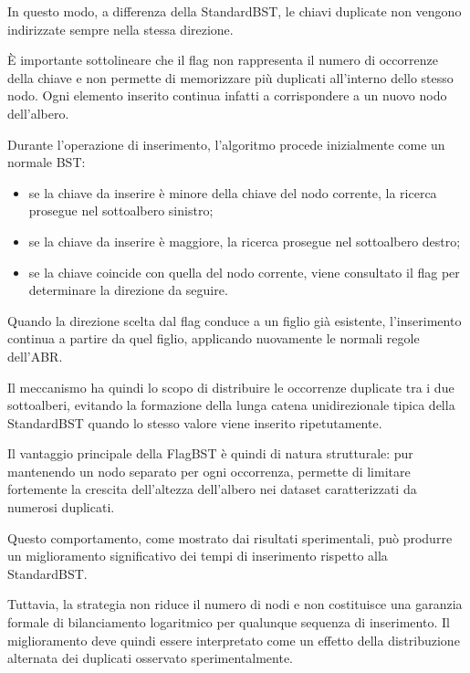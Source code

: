 \documentclass[a4paper,12pt]{article}
\begin{document}
In questo modo, a differenza della StandardBST, le chiavi duplicate non vengono indirizzate sempre nella stessa direzione.

È importante sottolineare che il flag non rappresenta il numero di occorrenze della chiave e non permette di memorizzare più duplicati all'interno dello stesso nodo. Ogni elemento inserito continua infatti a corrispondere a un nuovo nodo dell'albero.

Durante l'operazione di inserimento, l'algoritmo procede inizialmente come un normale BST:

\begin{itemize}

    \item se la chiave da inserire è minore della chiave del nodo corrente, la ricerca prosegue nel sottoalbero sinistro;

    \item se la chiave da inserire è maggiore, la ricerca prosegue nel sottoalbero destro;

    \item se la chiave coincide con quella del nodo corrente, viene consultato il flag per determinare la direzione da seguire.

\end{itemize}

Quando la direzione scelta dal flag conduce a un figlio già esistente, l'inserimento continua a partire da quel figlio, applicando nuovamente le normali regole dell'ABR.

Il meccanismo ha quindi lo scopo di distribuire le occorrenze duplicate tra i due sottoalberi, evitando la formazione della lunga catena unidirezionale tipica della StandardBST quando lo stesso valore viene inserito ripetutamente.

Il vantaggio principale della FlagBST è quindi di natura strutturale: pur mantenendo un nodo separato per ogni occorrenza, permette di limitare fortemente la crescita dell'altezza dell'albero nei dataset caratterizzati da numerosi duplicati.

Questo comportamento, come mostrato dai risultati sperimentali, può produrre un miglioramento significativo dei tempi di inserimento rispetto alla StandardBST.

Tuttavia, la strategia non riduce il numero di nodi e non costituisce una garanzia formale di bilanciamento logaritmico per qualunque sequenza di inserimento. Il miglioramento deve quindi essere interpretato come un effetto della distribuzione alternata dei duplicati osservato sperimentalmente.
\end{document}
